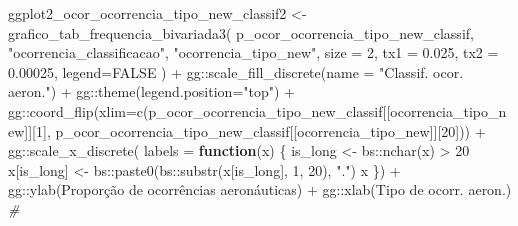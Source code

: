 \documentclass[
]{article}
\newenvironment{Shaded}{\begin{snugshade}}{\end{snugshade}}
\newcommand{\AttributeTok}[1]{\textcolor[rgb]{0.77,0.63,0.00}{#1}}
\newcommand{\CommentTok}[1]{\textcolor[rgb]{0.56,0.35,0.01}{\textit{#1}}}
\newcommand{\ConstantTok}[1]{\textcolor[rgb]{0.00,0.00,0.00}{#1}}
\newcommand{\ControlFlowTok}[1]{\textcolor[rgb]{0.13,0.29,0.53}{\textbf{#1}}}
\newcommand{\DecValTok}[1]{\textcolor[rgb]{0.00,0.00,0.81}{#1}}
\newcommand{\FloatTok}[1]{\textcolor[rgb]{0.00,0.00,0.81}{#1}}
\newcommand{\FunctionTok}[1]{\textcolor[rgb]{0.00,0.00,0.00}{#1}}
\newcommand{\NormalTok}[1]{#1}
\newcommand{\OtherTok}[1]{\textcolor[rgb]{0.56,0.35,0.01}{#1}}
\newcommand{\SpecialCharTok}[1]{\textcolor[rgb]{0.00,0.00,0.00}{#1}}
\newcommand{\StringTok}[1]{\textcolor[rgb]{0.31,0.60,0.02}{#1}}
\begin{document}
\begin{Shaded}
\begin{Highlighting}[]
\NormalTok{ggplot2\_ocor\_ocorrencia\_tipo\_new\_classif2 }\OtherTok{\textless{}{-}} \FunctionTok{grafico\_tab\_frequencia\_bivariada3}\NormalTok{(}
\NormalTok{    p\_ocor\_ocorrencia\_tipo\_new\_classif,}
    \StringTok{"ocorrencia\_classificacao"}\NormalTok{,}
    \StringTok{"ocorrencia\_tipo\_new"}\NormalTok{,}
    \AttributeTok{size =} \DecValTok{2}\NormalTok{,}
    \AttributeTok{tx1 =} \FloatTok{0.025}\NormalTok{,}
    \AttributeTok{tx2 =} \FloatTok{0.00025}\NormalTok{,}
    \AttributeTok{legend=}\ConstantTok{FALSE}
\NormalTok{) }\SpecialCharTok{+}\NormalTok{ gg}\SpecialCharTok{::}\FunctionTok{scale\_fill\_discrete}\NormalTok{(}\AttributeTok{name =} \StringTok{"Classif. ocor. aeron."}\NormalTok{) }\SpecialCharTok{+}
\NormalTok{    gg}\SpecialCharTok{::}\FunctionTok{theme}\NormalTok{(}\AttributeTok{legend.position=}\StringTok{"top"}\NormalTok{) }\SpecialCharTok{+} 
\NormalTok{    gg}\SpecialCharTok{::}\FunctionTok{coord\_flip}\NormalTok{(}\AttributeTok{xlim=}\FunctionTok{c}\NormalTok{(p\_ocor\_ocorrencia\_tipo\_new\_classif[[}\StringTok{\textquotesingle{}ocorrencia\_tipo\_new\textquotesingle{}}\NormalTok{]][}\DecValTok{1}\NormalTok{],}
\NormalTok{                         p\_ocor\_ocorrencia\_tipo\_new\_classif[[}\StringTok{\textquotesingle{}ocorrencia\_tipo\_new\textquotesingle{}}\NormalTok{]][}\DecValTok{20}\NormalTok{])) }\SpecialCharTok{+}
\NormalTok{    gg}\SpecialCharTok{::}\FunctionTok{scale\_x\_discrete}\NormalTok{(}
  \AttributeTok{labels =} \ControlFlowTok{function}\NormalTok{(x) \{}
\NormalTok{        is\_long }\OtherTok{\textless{}{-}}\NormalTok{ bs}\SpecialCharTok{::}\FunctionTok{nchar}\NormalTok{(x) }\SpecialCharTok{\textgreater{}} \DecValTok{20}
\NormalTok{        x[is\_long] }\OtherTok{\textless{}{-}}\NormalTok{ bs}\SpecialCharTok{::}\FunctionTok{paste0}\NormalTok{(bs}\SpecialCharTok{::}\FunctionTok{substr}\NormalTok{(x[is\_long], }\DecValTok{1}\NormalTok{, }\DecValTok{20}\NormalTok{), }\StringTok{"."}\NormalTok{)}
\NormalTok{        x}
\NormalTok{      \}) }\SpecialCharTok{+}
\NormalTok{    gg}\SpecialCharTok{::}\FunctionTok{ylab}\NormalTok{(}\StringTok{\textquotesingle{}Proporção de ocorrências aeronáuticas\textquotesingle{}}\NormalTok{) }\SpecialCharTok{+}
\NormalTok{    gg}\SpecialCharTok{::}\FunctionTok{xlab}\NormalTok{(}\StringTok{\textquotesingle{}Tipo de ocorr. aeron.\textquotesingle{}}\NormalTok{)}
\CommentTok{\# }
\end{Highlighting}
\end{Shaded}
\end{document}
